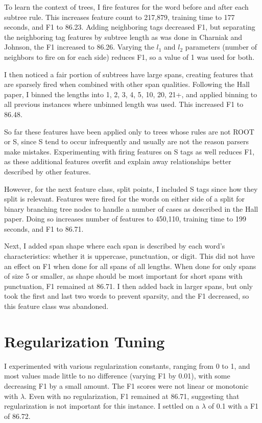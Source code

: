 \documentclass[11pt]{article}
\begin{document}
To learn the context of trees, I fire features for the word before and after each subtree rule.
This increases feature count to 217,879, training time to 177 seconds, and F1 to 86.23.
Adding neighboring tags decreased F1, but separating the neighboring tag features by subtree
length as was done in Charniak and Johnson, the F1 increased to 86.26. Varying the $l_1$ and $l_2$
parameters (number of neighbors to fire on for each side) reduces F1, so a value of 1 was used
for both.

I then noticed a fair portion of subtrees have large spans, creating features that are sparsely
fired when combined with other span qualities. Following the Hall paper, I binned the lengths
into 1, 2, 3, 4, 5, 10, 20, 21+, and applied binning to all previous instances where unbinned
length was used. This increased F1 to 86.48.

So far these features have been applied only to trees whose rules are not ROOT or S, since
S tend to occur infrequently and usually are not the reason parsers make mistakes. Experimenting
with firing features on S tags as well reduces F1, as these additional features overfit and
explain away relationships better described by other features.

However, for the next feature class, split points, I included S tags since how they split is
relevant. Features were fired for the words on either side of a split for binary branching
tree nodes to handle a number of cases as described in the Hall paper. Doing so increases
number of features to 450,110, training time to 199 seconds, and F1 to 86.71.

Next, I added span shape where each span is described by each word's characteristics: whether
it is uppercase, punctuation, or digit. This did not have an effect on F1 when done for all
spans of all lengths. When done for only spans of size 5 or smaller, as shape should be most
important for short spans with punctuation, F1 remained at 86.71. I then added back in larger
spans, but only took the first and last two words to prevent sparsity, and the F1 decreased, so
this feature class was abandoned.

\section{Regularization Tuning}

I experimented with various regularization constants, ranging from 0 to 1, and most values
made little to no difference (varying F1 by 0.01), with some decreasing F1 by a small amount. 
The F1 scores were not linear or monotonic with $\lambda$. 
Even with no regularization, F1 remained at 86.71, suggesting that regularization is not important
for this instance.
I settled on a $\lambda$ of 0.1 with a F1 of 86.72.
\end{document}

